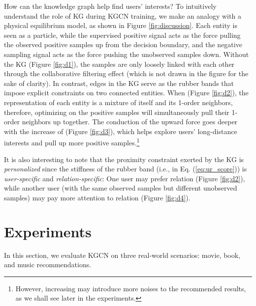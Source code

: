\documentclass[sigconf]{acmart}
\begin{document}
		How can the knowledge graph help find users' interests?
		To intuitively understand the role of KG during KGCN training, we make an analogy with a physical equilibrium model, as shown in Figure \ref{fig:discussion}.
		Each entity is seen as a particle, while the supervised positive signal acts as the force pulling the observed positive samples up from the decision boundary, and the negative sampling signal acts as the force pushing the unobserved samples down.
		Without the KG (Figure \ref{fig:d1}), the samples are only loosely linked with each other through the collaborative filtering effect (which is not drawn in the figure for the sake of clarity).
		In contrast, edges in the KG serve as the rubber bands that impose explicit constraints on two connected entities.
		When  (Figure \ref{fig:d2}), the representation of each entity is a mixture of itself and its 1-order neighbors, therefore, optimizing on the positive samples will simultaneously pull their 1-order neighbors up together.
		The conduction of the upward force goes deeper with the increase of  (Figure \ref{fig:d3}), which helps explore users' long-distance interests and pull up more positive samples.\footnote{However, increasing  may introduce more noises to the recommended results, as we shall see later in the experiments.}
		
		It is also interesting to note that the proximity constraint exerted by the KG is \textit{personalized} since the stiffness of the rubber band (i.e.,  in Eq. (\ref{eq:ur_score})) is \textit{user-specific} and \textit{relation-specific}:
		One user may prefer relation  (Figure \ref{fig:d2}), while another user (with the same observed samples but different unobserved samples) may pay more attention to relation  (Figure \ref{fig:d4}).
		\fi		
		

			
\section{Experiments}
	In this section, we evaluate KGCN on three real-world scenarios: movie, book, and music recommendations.
	
\end{document}
